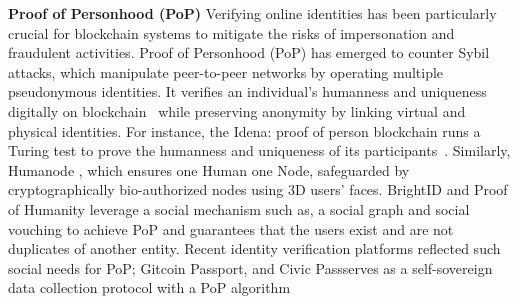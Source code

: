\textbf{Proof of Personhood (PoP)} Verifying online identities has been particularly crucial for blockchain systems to mitigate the risks of impersonation and fraudulent activities. 
Proof of Personhood (PoP) has emerged to counter Sybil attacks, which manipulate peer-to-peer networks by operating multiple pseudonymous identities. It verifies an individual's humanness and uniqueness digitally on blockchain~\cite{borge2017proof} while preserving anonymity by linking virtual and physical identities.  
For instance, the Idena: proof of person blockchain runs a Turing test to prove the humanness and uniqueness of its participants~\cite{idenaWhitepaper}. 
Similarly, Humanode \cite{kavazi2021humanode, kavazi2023humanode}, which ensures one Human one Node, safeguarded by cryptographically bio-authorized nodes using 3D users’ faces. BrightID and Proof of Humanity leverage a social mechanism such as, a social graph and social vouching to achieve PoP \cite{shilina2023revolutionizing} and
guarantees that the users exist and are not duplicates of another entity. Recent identity verification platforms reflected such social needs for PoP; Gitcoin Passport, and Civic Passserves as a self-sovereign data collection protocol with a PoP algorithm~\cite{shilina2023revolutionizing}

